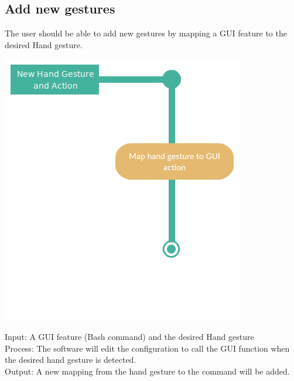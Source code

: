 \documentclass[11pt]{report}
\begin{document}
\subsection{Add new gestures}
The user should be able to add new gestures by mapping a GUI feature to the desired Hand gesture.
\begin{center}
    \includegraphics[scale=0.5]{add.png}
\end{center}
Input: A GUI feature (Bash command) and the desired Hand gesture
\\Process: The software will edit the configuration to call the GUI function when the desired hand gesture is detected.
\\Output: A new mapping from the hand gesture to the command will be added.
\end{document}
